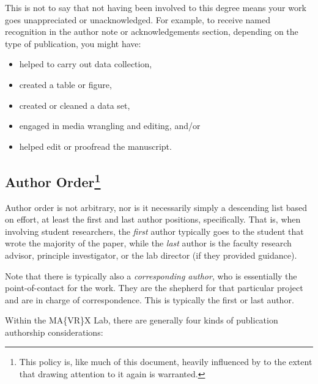 \documentclass[]{tufte-book}
\providecommand{\tightlist}{%
  \setlength{\itemsep}{0pt}\setlength{\parskip}{0pt}}
\begin{document}
This is not to say that not having been involved to this degree means your work goes unappreciated or unacknowledged. For example, to receive named recognition in the author note or acknowledgements section, depending on the type of publication, you might have:

\begin{itemize}
\tightlist
\item
  helped to carry out data collection,
\item
  created a table or figure,
\item
  created or cleaned a data set,
\item
  engaged in media wrangling and editing, and/or
\item
  helped edit or proofread the manuscript.
\end{itemize}

\hypertarget{author-order}{%
\subsection[Author Order]{\texorpdfstring{Author Order\footnote{This policy is, like much of this document, heavily influenced by \citet{Minda_Nielsen_2018} to the extent that drawing attention to it again is warranted.}}{Author Order}}\label{author-order}}

Author order is not arbitrary, nor is it necessarily simply a descending list based on effort, at least the first and last author positions, specifically. That is, when involving student researchers, the \emph{first} author typically goes to the student that wrote the majority of the paper, while the \emph{last} author is the faculty research advisor, principle investigator, or the lab director (if they provided guidance).

Note that there is typically also a \emph{corresponding author}, who is essentially the point-of-contact for the work. They are the shepherd for that particular project and are in charge of correspondence. This is typically the first or last author.

Within the MA\{VR\}X Lab, there are generally four kinds of publication authorship considerations:
\end{document}
